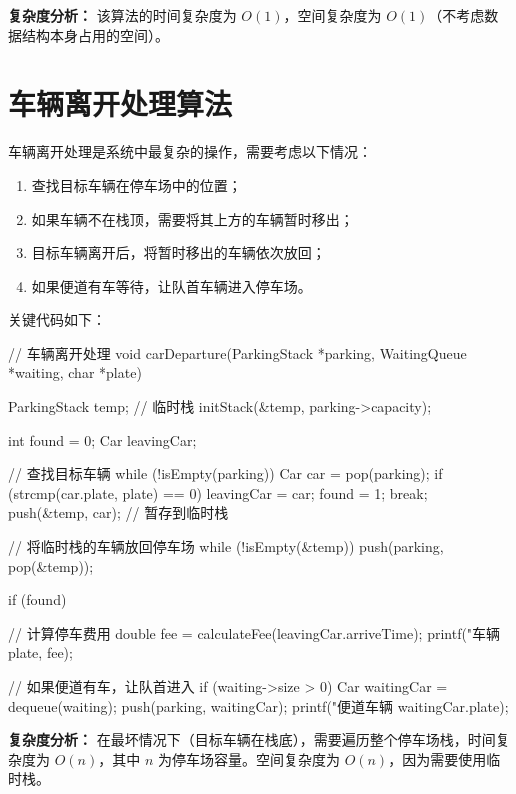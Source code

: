 \documentclass[a4paper,12pt,twoside]{ctexrep}
\begin{document}
\textbf{复杂度分析：} 该算法的时间复杂度为 $O(1)$，空间复杂度为 $O(1)$（不考虑数据结构本身占用的空间）。

\section{车辆离开处理算法}

车辆离开处理是系统中最复杂的操作，需要考虑以下情况：

\begin{enumerate}
  \item 查找目标车辆在停车场中的位置；
  \item 如果车辆不在栈顶，需要将其上方的车辆暂时移出；
  \item 目标车辆离开后，将暂时移出的车辆依次放回；
  \item 如果便道有车等待，让队首车辆进入停车场。
\end{enumerate}

关键代码如下：

\begin{codeblock}
// 车辆离开处理
void carDeparture(ParkingStack *parking, 
                  WaitingQueue *waiting, 
                  char *plate) {
    ParkingStack temp;  // 临时栈
    initStack(&temp, parking->capacity);
    
    int found = 0;
    Car leavingCar;
    
    // 查找目标车辆
    while (!isEmpty(parking)) {
        Car car = pop(parking);
        if (strcmp(car.plate, plate) == 0) {
            leavingCar = car;
            found = 1;
            break;
        }
        push(&temp, car);  // 暂存到临时栈
    }
    
    // 将临时栈的车辆放回停车场
    while (!isEmpty(&temp)) {
        push(parking, pop(&temp));
    }
    
    if (found) {
        // 计算停车费用
        double fee = calculateFee(leavingCar.arriveTime);
        printf("车辆 %
               plate, fee);
        
        // 如果便道有车，让队首进入
        if (waiting->size > 0) {
            Car waitingCar = dequeue(waiting);
            push(parking, waitingCar);
            printf("便道车辆 %
                   waitingCar.plate);
        }
    }
}
\end{codeblock}

\textbf{复杂度分析：} 在最坏情况下（目标车辆在栈底），需要遍历整个停车场栈，时间复杂度为 $O(n)$，其中 $n$ 为停车场容量。空间复杂度为 $O(n)$，因为需要使用临时栈。
\end{document}
